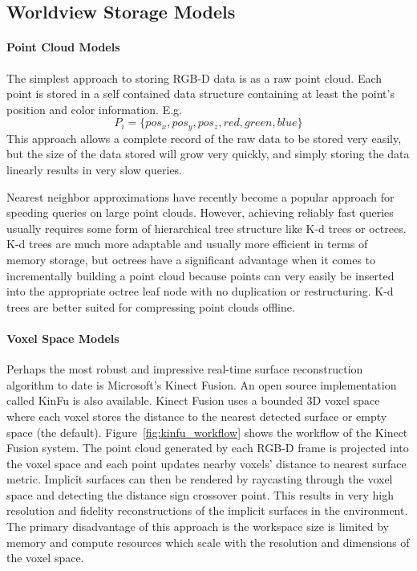 \subsection{Worldview Storage Models}
\paragraph{Point Cloud Models}
The simplest approach to storing RGB-D data is as a raw point cloud. Each point is stored in a self contained data structure containing at least the point's position and color information. E.g. $$P_i=\{pos_x,pos_y,pos_z,red,green,blue\}$$ This approach allows a complete record of the raw data to be stored very easily, but the size of the data stored will grow very quickly, and simply storing the data linearly results in very slow queries.\par
Nearest neighbor approximations have recently become a popular approach for speeding queries on large point clouds\cite{muja2009fast}. However, achieving reliably fast queries usually requires some form of hierarchical tree structure like K-d trees\cite{nuchter:kdtree} or octrees\cite{octomap}. K-d trees are much more adaptable and usually more efficient in terms of memory storage, but octrees have a significant advantage when it comes to incrementally building a point cloud because points can very easily be inserted into the appropriate octree leaf node with no duplication or restructuring. K-d trees are better suited for compressing point clouds offline.
\paragraph{Voxel Space Models}
Perhaps the most robust and impressive real-time surface reconstruction algorithm to date is Microsoft's Kinect Fusion\cite{newcombe2011kinectfusion,izadi2011kinectfusion}. An open source implementation called KinFu is also available\cite{kinfu}. Kinect Fusion uses a bounded 3D voxel space where each voxel stores the distance to the nearest detected surface  or empty space (the default). Figure~\ref{fig:kinfu_workflow} shows the workflow of the Kinect Fusion system. The point cloud generated by each RGB-D frame is projected into the voxel space and each point updates nearby voxels' distance to nearest surface metric. Implicit surfaces can then be rendered by raycasting through the voxel space and detecting the distance sign crossover point. This results in very high resolution and fidelity reconstructions of the implicit surfaces in the environment. The primary disadvantage of this approach is the workspace size is limited by memory and compute resources which scale with the resolution and dimensions of the voxel space. \par

